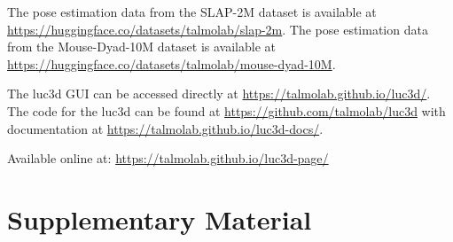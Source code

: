 \documentclass[pdflatex, sn-nature]{sn-jnl}
\theoremstyle{thmstyleone}%
\theoremstyle{thmstyletwo}%
\theoremstyle{thmstylethree}%
\begin{document}
\backmatter


The pose estimation data from the SLAP-2M dataset is available at \hyperlink{https://huggingface.co/datasets/talmolab/slap-2m}{https://huggingface.co/datasets/talmolab/slap-2m}. The pose estimation data from the Mouse-Dyad-10M dataset is available at \hyperlink{https://huggingface.co/datasets/talmolab/mouse-dyad-10M}{https://huggingface.co/datasets/talmolab/mouse-dyad-10M}.

The luc3d GUI can be accessed directly at \hyperlink{https://talmolab.github.io/luc3d/}{https://talmolab.github.io/luc3d/}. The code for the luc3d can be found at \hyperlink{https://github.com/talmolab/luc3d}{https://github.com/talmolab/luc3d} with documentation at \hyperlink{https://talmolab.github.io/luc3d-docs/}{https://talmolab.github.io/luc3d-docs/}. 


Available online at: \url{https://talmolab.github.io/luc3d-page/}

\section*{Supplementary Material}
\end{document}
